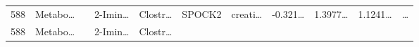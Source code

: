 \documentclass[
]{article}
\begin{document}
\begin{longtable}[]{@{}lllllllllll@{}}
\begin{minipage}[t]{0.03\columnwidth}
588\strut
\end{minipage} & \begin{minipage}[t]{0.07\columnwidth}\raggedright
Metabo\ldots{}\strut
\end{minipage} & \begin{minipage}[t]{0.07\columnwidth}\raggedright
\strut
\end{minipage} & \begin{minipage}[t]{0.09\columnwidth}\raggedright
2-Imin\ldots{}\strut
\end{minipage} & \begin{minipage}[t]{0.07\columnwidth}\raggedright
Clostr\ldots{}\strut
\end{minipage} & \begin{minipage}[t]{0.07\columnwidth}\raggedright
SPOCK2\strut
\end{minipage} & \begin{minipage}[t]{0.09\columnwidth}\raggedright
creati\ldots{}\strut
\end{minipage} & \begin{minipage}[t]{0.07\columnwidth}\raggedright
-0.321\ldots{}\strut
\end{minipage} & \begin{minipage}[t]{0.07\columnwidth}\raggedright
1.3977\ldots{}\strut
\end{minipage} & \begin{minipage}[t]{0.07\columnwidth}\raggedright
1.1241\ldots{}\strut
\end{minipage} & \begin{minipage}[t]{0.03\columnwidth}\raggedright
\ldots{}\strut
\end{minipage}\tabularnewline
\begin{minipage}[t]{0.03\columnwidth}\raggedright
588\strut
\end{minipage} & \begin{minipage}[t]{0.07\columnwidth}\raggedright
Metabo\ldots{}\strut
\end{minipage} & \begin{minipage}[t]{0.07\columnwidth}\raggedright
\strut
\end{minipage} & \begin{minipage}[t]{0.09\columnwidth}\raggedright
2-Imin\ldots{}\strut
\end{minipage} & \begin{minipage}[t]{0.07\columnwidth}\raggedright
Clostr\ldots{}\strut
\end{minipage} & \begin{minipage}[t]{0.07\columnwidth}\raggedright

\end{minipage}
\end{longtable}
\end{document}
